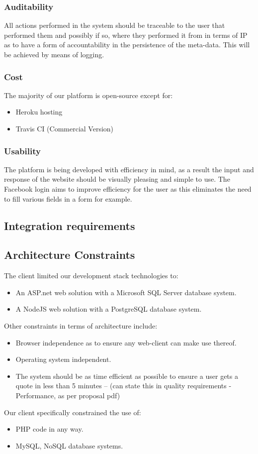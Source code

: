 \documentclass{article}
\begin{document}
		\subsubsection{Auditability}
		 All actions performed in the system should be traceable to the user that performed them and possibly if so, where they performed it from in terms of IP as to have a form of accountability in the persistence of the meta-data. This will be achieved by means of logging.
		\subsubsection{Cost}
		The majority of our platform is open-source except for:
		\begin{itemize}
			\item Heroku hosting
			\item Travis CI (Commercial Version)		
		\end{itemize}
		\subsubsection{Usability}
		The platform is being developed with efficiency in mind, as a result the input and response of the website should be visually pleasing and simple to use. The Facebook login aims to improve efficiency for the user as this eliminates the need to fill various fields in a form for example.

		

	\subsection{Integration requirements}
	
	\subsection{Architecture Constraints}
	The client limited our development stack technologies to:
	\begin{itemize}
		\item An ASP.net web solution with a Microsoft SQL Server database system.
		\item A NodeJS web solution with a PostgreSQL database system.
	\end{itemize}
	Other constraints in terms of architecture include:
	\begin{itemize}
		\item Browser independence as to ensure any web-client can make use thereof.
		\item Operating system independent.
		\item The system should be as time efficient as possible to ensure a user gets a quote in less than 5 minutes -- (can state this in quality requirements -Performance, as per proposal pdf)
		\end{itemize}
	Our client specifically constrained the use of:
		\begin{itemize}
		\item PHP code in any way.
		\item MySQL, NoSQL database systems.
		\end{itemize}
	
\end{document}
